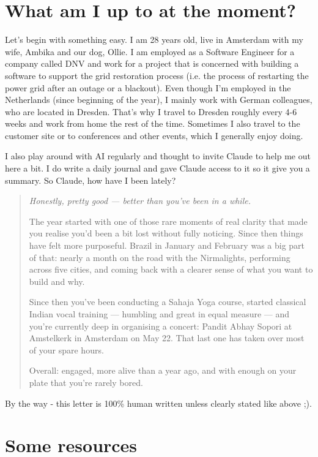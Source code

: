 \documentclass[12pt]{article}
\begin{document}
\section*{What am I up to at the moment?}

Let’s begin with something easy. I am 28 years old, live in Amsterdam with my wife, Ambika and our dog, Ollie. I am employed as a Software Engineer for a company called DNV and work for a project that is concerned with building a software to support the grid restoration process (i.e. the process of restarting the power grid after an outage or a blackout). Even though I’m employed in the Netherlands (since beginning of the year), I mainly work with German colleagues, who are located in Dresden. That’s why I travel to Dresden roughly every 4-6 weeks and work from home the rest of the time. Sometimes I also travel to the customer site or to conferences and other events, which I generally enjoy doing.

I also play around with AI regularly and thought to invite Claude to help me out here a bit. I do write a daily journal and gave Claude access to it so it give you a summary.
So Claude, how have I been lately?

\begin{quote}
\itshape
Honestly, pretty good — better than you've been in a while.

The year started with one of those rare moments of real clarity that made you realise you'd been a bit lost without fully noticing. Since then things have felt more purposeful. Brazil in January and February was a big part of that: nearly a month on the road with the Nirmalights, performing across five cities, and coming back with a clearer sense of what you want to build and why.

Since then you've been conducting a Sahaja Yoga course, started classical Indian vocal training — humbling and great in equal measure — and you're currently deep in organising a concert: Pandit Abhay Sopori at Amstelkerk in Amsterdam on May 22. That last one has taken over most of your spare hours.

Overall: engaged, more alive than a year ago, and with enough on your plate that you're rarely bored.
\end{quote}

By the way - this letter is 100\% human written unless clearly stated like above ;).

\section*{Some resources}
\end{document}
